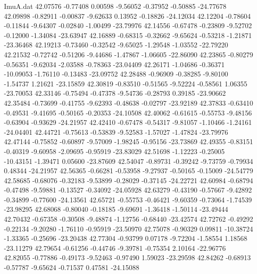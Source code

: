 \begin{filecontents}{ImuA.dat}
  42.07576   -0.77408    0.00598   -9.56052   -0.37952   -0.50885  -24.77678
  42.09898   -0.82911   -0.00837   -9.62633    0.13952   -0.18826  -24.12034
  42.12204   -0.78604   -0.11844   -9.64307   -0.02840   -1.00499  -23.79976
  42.14556   -0.67478   -0.23809   -9.52702   -0.12000   -1.34084  -23.63947
  42.16889   -0.68315   -0.32662   -9.65624   -0.53218   -1.21871  -23.36468
  42.19213   -0.73460   -0.32542   -9.65025   -1.29548   -1.03552  -22.79220
  42.21532   -0.72742   -0.51206   -9.44686   -1.47867   -1.06605  -22.86090
  42.23865   -0.80279   -0.56351   -9.62034   -2.03588   -0.78363  -23.04409
  42.26171   -1.04686   -0.36371  -10.09053   -1.76110   -0.13483  -23.09752
  42.28488   -0.96909   -0.38285   -9.80100   -1.54737    1.21621  -23.15859
  42.30819   -0.83510   -0.51565   -9.52224   -0.58561    1.06355  -23.70053
  42.33146   -0.75494   -0.47378   -9.54736   -0.28793    0.39185  -23.90662
  42.35484   -0.73699   -0.41755   -9.62393   -0.48638   -0.02797  -23.92189
  42.37833   -0.63410   -0.49531   -9.41695   -0.50165   -0.20353  -24.10508
  42.40062   -0.61615   -0.55753   -9.48156   -0.63904   -0.93629  -24.21957
  42.42410   -0.67478   -0.54317   -9.81057   -1.10466   -1.24161  -24.04401
  42.44721   -0.75613   -0.53839   -9.52583   -1.57027   -1.47824  -23.79976
  42.47144   -0.75852   -0.60897   -9.57009   -1.98245   -0.95156  -23.73869
  42.49355   -0.83151   -0.40319   -9.60958   -2.09695   -0.95919  -23.83029
  42.51698   -1.12223   -0.25005  -10.43151   -1.39471    0.05600  -23.87609
  42.54047   -0.89731   -0.39242   -9.73759   -0.79934    0.48344  -24.21957
  42.56365   -0.66281   -0.53958   -9.27937   -0.50165   -0.15009  -24.54779
  42.58685   -0.68076   -0.32183   -9.53899   -0.28029   -0.37145  -24.22721
  42.60984   -0.68794   -0.47498   -9.59881   -0.13527   -0.34092  -24.05928
  42.63279   -0.43190   -0.57667   -9.42892   -0.34899   -0.77600  -24.13561
  42.65721   -0.55753   -0.46421   -9.60359   -0.73064   -1.74539  -23.98295
  42.68068   -0.80040   -0.18185   -9.69691   -1.36418   -1.50114  -23.49444
  42.70432   -0.67358   -0.30508   -9.48874   -1.12756   -0.68440  -23.42574
  42.72762   -0.49292   -0.22134   -9.20280   -1.76110   -0.95919  -23.50970
  42.75078   -0.90329    0.09811  -10.38724   -1.33365   -0.25696  -23.20438
  42.77304   -0.93799    0.07178   -9.72204   -1.58554    1.18568  -23.11279
  42.79654   -0.61256   -0.44746   -9.39781   -0.75354    2.10164  -22.96776
  42.82055   -0.77886   -0.49173   -9.52463   -0.97490    1.59023  -23.29598
  42.84262   -0.68913   -0.57787   -9.65624   -0.71537    0.47581  -24.15088

\end{filecontents}
